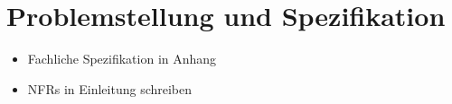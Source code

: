 \section{Problemstellung und Spezifikation}
\begin{itemize}
	\item Fachliche Spezifikation in Anhang
	\item NFRs in Einleitung schreiben
\end{itemize}
